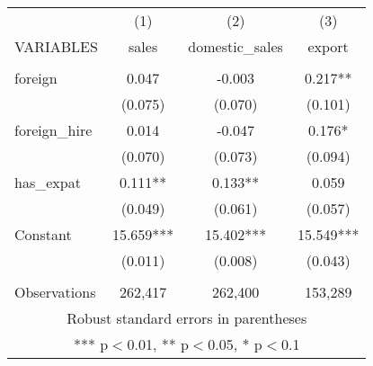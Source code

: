 \begin{tabular}{lccc} \hline
 & (1) & (2) & (3) \\
VARIABLES & sales & domestic\_sales & export \\ \hline
 &  &  &  \\
foreign & 0.047 & -0.003 & 0.217** \\
 & (0.075) & (0.070) & (0.101) \\
foreign\_hire & 0.014 & -0.047 & 0.176* \\
 & (0.070) & (0.073) & (0.094) \\
has\_expat & 0.111** & 0.133** & 0.059 \\
 & (0.049) & (0.061) & (0.057) \\
Constant & 15.659*** & 15.402*** & 15.549*** \\
 & (0.011) & (0.008) & (0.043) \\
 &  &  &  \\
 Observations & 262,417 & 262,400 & 153,289 \\ \hline
\multicolumn{4}{c}{ Robust standard errors in parentheses} \\
\multicolumn{4}{c}{ *** p$<$0.01, ** p$<$0.05, * p$<$0.1} \\
\end{tabular}
